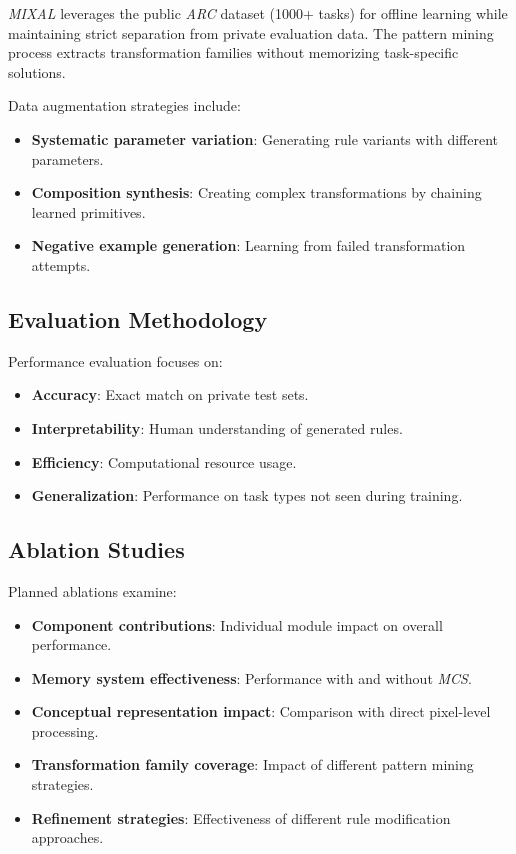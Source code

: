 \documentclass[12pt]{article}
\newcommand{\arc}{\textit{ARC}}
\newcommand{\MIXAL}{\textit{MIXAL}}
\newcommand{\mcs}{\textit{MCS}}
\begin{document}
\MIXAL{} leverages the public \arc{} dataset (1000+ tasks) for offline learning while maintaining strict separation from private evaluation data. The pattern mining process extracts transformation families without memorizing task-specific solutions.

Data augmentation strategies include:
\begin{itemize}[noitemsep,topsep=0pt]
\item\textbf{Systematic parameter variation}: Generating rule variants with different parameters.
\item\textbf{Composition synthesis}: Creating complex transformations by chaining learned primitives.
\item\textbf{Negative example generation}: Learning from failed transformation attempts.
\end{itemize}

\subsection{Evaluation Methodology}

Performance evaluation focuses on:
\begin{itemize}[noitemsep,topsep=0pt]
\item\textbf{Accuracy}: Exact match on private test sets.
\item\textbf{Interpretability}: Human understanding of generated rules.
\item\textbf{Efficiency}: Computational resource usage.
\item\textbf{Generalization}: Performance on task types not seen during training.
\end{itemize}

\subsection{Ablation Studies}

Planned ablations examine:
\begin{itemize}[noitemsep,topsep=0pt]
\item\textbf{Component contributions}: Individual module impact on overall performance.
\item\textbf{Memory system effectiveness}: Performance with and without \mcs{}.
\item\textbf{Conceptual representation impact}: Comparison with direct pixel-level processing.
\item\textbf{Transformation family coverage}: Impact of different pattern mining strategies.
\item\textbf{Refinement strategies}: Effectiveness of different rule modification approaches.
\end{itemize}
\end{document}
